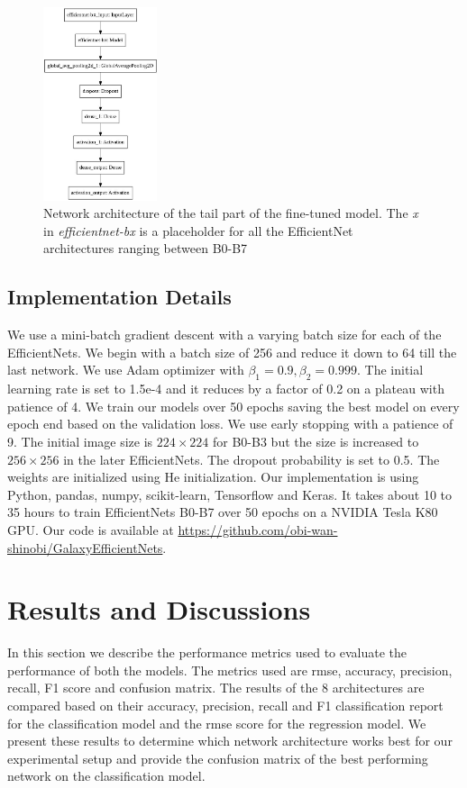 \documentclass[fleqn,usenatbib]{mnras}
\begin{document}
\begin{figure}
    \centering
    \includegraphics[width=0.3\textwidth, height=0.5\textwidth]{images/network_arch.jpeg}
    \caption{Network architecture of the tail part of the fine-tuned model. The \textit{x} in \textit{efficientnet-bx} is a placeholder for all the EfficientNet architectures ranging between B0-B7}
    \label{fig:Network Architecture}
\end{figure} 

\subsection{Implementation Details}
\hspace*{0.25in}We use a mini-batch gradient descent with a varying batch size for each of the EfficientNets. We begin with a batch size of 256 and reduce it down to 64 till the last network. We use Adam optimizer with $\beta_1 = 0.9 , \beta_2 = 0.999$. The initial learning rate is set to 1.5e-4 and it reduces by a factor of 0.2 on a plateau with patience of 4. We train our models over 50 epochs saving the best model on every epoch end based on the validation loss. We use early stopping with a patience of 9. The initial image size is $224\times224$ for B0-B3 but the size is increased to $256\times256$ in the later EfficientNets. The dropout probability is set to 0.5. The weights are initialized using He initialization. Our implementation is using Python, pandas, numpy, scikit-learn, Tensorflow and Keras. It takes about 10 to 35 hours to train EfficientNets B0-B7 over 50 epochs on a NVIDIA Tesla K80 GPU. Our code is available at \href{https://github.com/obi-wan-shinobi/GalaxyEfficientNets}{https://github.com/obi-wan-shinobi/GalaxyEfficientNets}.

\section{Results and Discussions}
\hspace*{0.25in}In this section we describe the performance metrics used to evaluate the performance of both the models. The metrics used are rmse, accuracy, precision, recall, F1 score and confusion matrix. The results of the 8 architectures are compared based on their accuracy, precision, recall and F1 classification report for the classification model and the rmse score for the regression model. We present these results to determine which network architecture works best for our experimental setup and provide the confusion matrix of the best performing network on the classification model. 
\end{document}
